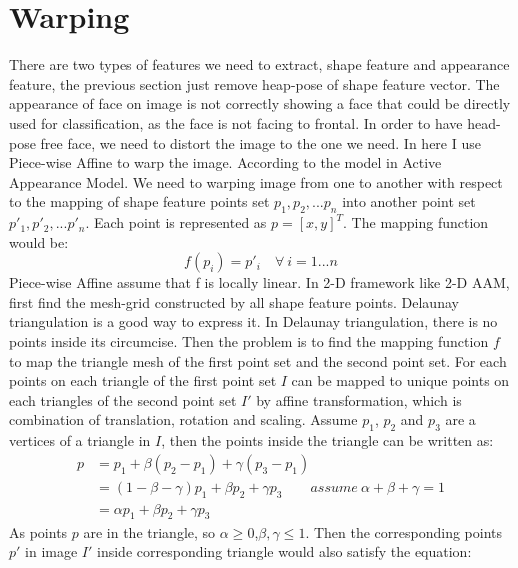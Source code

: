 \section{Warping}
There are two types of features we need to extract, shape feature and appearance feature, the previous section just remove heap-pose of shape feature vector. The appearance of face on image is not correctly showing a face that could be directly used for classification, as the face is not facing to frontal. In order to have head-pose free face, we need to distort the image to the one we need. In here I use Piece-wise Affine\cite{AAMWarp} to warp the image. According to the model in Active Appearance Model. We need to warping image from one to another with respect to the mapping of shape feature points set ${p_{1},p_{2},...p_{n}}$ into another point set ${p'_{1},p'_{2},...p'_{n}}$. Each point is represented as $p = [x,y]^{T}$. The mapping function would be:
\begin{equation}
f(p_{i}) = p'_{i} \quad \forall \ i = 1...n
\label{eq:W1}
\end{equation}
\newline
Piece-wise Affine assume that f is locally linear. In 2-D framework like 2-D AAM, first find the mesh-grid constructed by all shape feature points. Delaunay triangulation is a good way to express it. In Delaunay triangulation, there is no points inside its circumcise. Then the problem is to find the mapping function $f$ to map the triangle mesh of the first point set and the second point set. For each points on each triangle of the first point set $I$ can be mapped to unique points on each triangles of the second point set $I'$ by affine transformation, which is combination of translation, rotation and scaling. Assume $p_{1}$, $p_{2}$ and $p_{3}$ are a vertices of a triangle in $I$, then the points inside the triangle can be written as:
\begin{equation}
\begin{split}
p 
& = p_{1} + \beta (p_{2}-p_{1})+\gamma (p_{3}-p_{1}) \\
& = (1-\beta-\gamma)p_{1} + \beta p_{2} + \gamma p_{3} \quad \quad assume \: \alpha + \beta + \gamma = 1\\
&  = \alpha p_{1} + \beta p_{2} + \gamma p_{3}
\end{split}
\end{equation}
\newline
As points $p$ are in the triangle, so $\alpha\geq 0$,$\beta,\gamma \leq 1$. Then the corresponding points $p'$ in image $I'$ inside corresponding triangle would also satisfy the equation:

